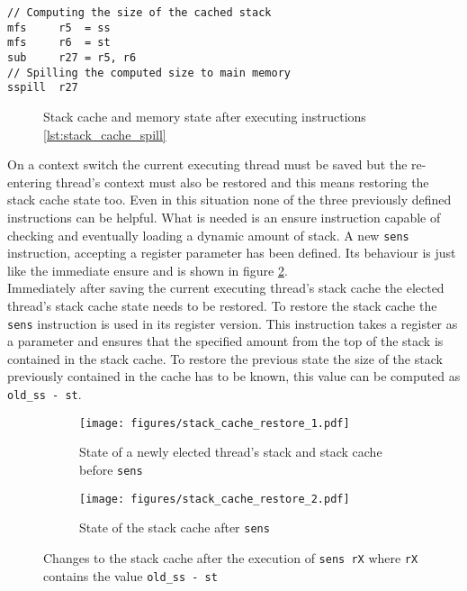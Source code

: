 \begin{lstlisting}[caption=Code for spilling to main memory the cached stack, label=lst:stack_cache_spill]
// Computing the size of the cached stack
mfs		r5	= ss
mfs		r6	= st
sub 	r27 = r5, r6
// Spilling the computed size to main memory
sspill	r27
\end{lstlisting}

	\begin{figure}[!ht]
		\begin{center}
		\end{center}
		\caption{Stack cache and memory state after executing instructions \ref{lst:stack_cache_spill}}
		\label{stack_cache_spilled}
	\end{figure}

On a context switch the current executing thread must be saved but the re-entering thread's context must also be restored and this means restoring the stack cache state too. Even in this situation none of the three previously defined instructions can be helpful. What is needed is an ensure instruction capable of checking and eventually loading a dynamic amount of stack. A new \texttt{sens} instruction, accepting a register parameter has been defined. Its behaviour is just like the immediate ensure and is shown in figure \ref{stack_cache_restore}.\\

Immediately after saving the current executing thread's stack cache the elected thread's stack cache state needs to be restored. To restore the stack cache the \texttt{sens} instruction is used in its register version. This instruction takes a register as a parameter and ensures that the specified amount from the top of the stack is contained in the stack cache. To restore the previous state the size of the stack previously contained in the cache has to be known, this value can be computed as \texttt{old\_ss - st}.

\begin{figure}[!ht]
        \centering
        \begin{subfigure}[b]{\textwidth}
                \centering
                \texttt{[image: figures/stack\_cache\_restore\_1.pdf]}
                \caption{State of a newly elected thread's stack and stack cache before \texttt{sens}}
        \end{subfigure}%
	
		\vspace{1cm}

        \begin{subfigure}[b]{\textwidth}
                \centering
                \texttt{[image: figures/stack\_cache\_restore\_2.pdf]}
                \caption{State of the stack cache after \texttt{sens}}
        \end{subfigure}
        \caption{Changes to the stack cache after the execution of \texttt{sens rX} where \texttt{rX} contains the value \texttt{old\_ss - st}}\label{stack_cache_restore}
\end{figure}

